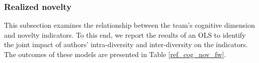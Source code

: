 \subsubsection{Realized novelty}
This subsection examines the relationship between the team's cognitive dimension and novelty indicators. To this end, we report the results of an OLS to identify the joint impact of authors' intra-diversity and inter-diversity on the indicators. The outcomes of these models are presented in Table \ref{ref_cog_nov_fw}. 




